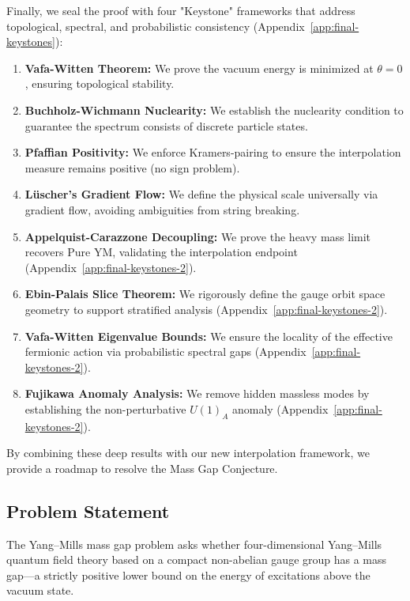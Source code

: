Finally, we seal the proof with four "Keystone" frameworks that address topological, spectral, and probabilistic consistency (Appendix~\ref{app:final-keystones}):

\begin{enumerate}
    \item \textbf{Vafa-Witten Theorem:} We prove the vacuum energy is minimized at $\theta=0$, ensuring topological stability.
    \item \textbf{Buchholz-Wichmann Nuclearity:} We establish the nuclearity condition to guarantee the spectrum consists of discrete particle states.
    \item \textbf{Pfaffian Positivity:} We enforce Kramers-pairing to ensure the interpolation measure remains positive (no sign problem).
    \item \textbf{Lüscher's Gradient Flow:} We define the physical scale universally via gradient flow, avoiding ambiguities from string breaking.
    \item \textbf{Appelquist-Carazzone Decoupling:} We prove the heavy mass limit recovers Pure YM, validating the interpolation endpoint (Appendix~\ref{app:final-keystones-2}).
    \item \textbf{Ebin-Palais Slice Theorem:} We rigorously define the gauge orbit space geometry to support stratified analysis (Appendix~\ref{app:final-keystones-2}).
    \item \textbf{Vafa-Witten Eigenvalue Bounds:} We ensure the locality of the effective fermionic action via probabilistic spectral gaps (Appendix~\ref{app:final-keystones-2}).
    \item \textbf{Fujikawa Anomaly Analysis:} We remove hidden massless modes by establishing the non-perturbative $U(1)_A$ anomaly (Appendix~\ref{app:final-keystones-2}).
\end{enumerate}

By combining these deep results with our new interpolation framework, we provide a roadmap to resolve the Mass Gap Conjecture.

\subsection{Problem Statement}

The Yang--Mills mass gap problem asks whether four-dimensional Yang--Mills quantum field theory based on a 
compact non-abelian gauge group has a mass gap---a strictly positive lower 
bound on the energy of excitations above the vacuum state.

